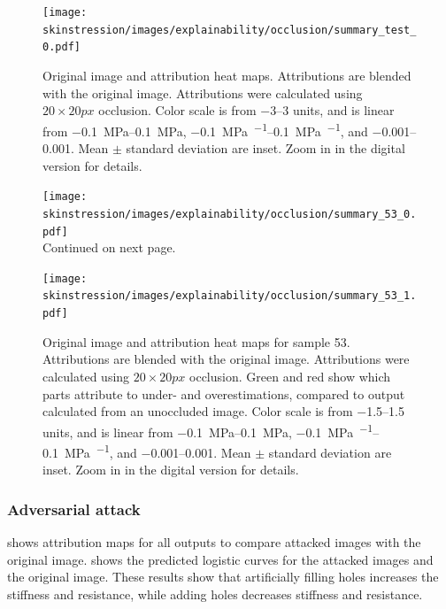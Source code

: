 \begin{figure}
    \centering
    \texttt{[image: skinstression/images/explainability/occlusion/summary\_test\_0.pdf]}
    \caption[Original image and attribution heat maps]{
        Original image and attribution heat maps.
        Attributions are blended with the original image.
        Attributions were calculated using $20\times 20\unit{px}$ occlusion.
        Color scale is from \numrange{-3}{3} units, and is linear from \qtyrange{-0.1}{0.1}{\mega\pascal}, \qtyrange{-0.1}{0.1}{\mega\pascal\per\stretch}, and \qtyrange{-0.001}{0.001}{\stretch}.
        Mean $\pm$ standard deviation are inset.
        Zoom in in the digital version for details.
    }
    \label{fig:skin_occlusion}
\end{figure}


\begin{figure}
    \ContinuedFloat
    \centering
    \texttt{[image: skinstression/images/explainability/occlusion/summary\_53\_0.pdf]} \\
    \raggedleft Continued on next page.
\end{figure}
\begin{figure}
    \centering
    \texttt{[image: skinstression/images/explainability/occlusion/summary\_53\_1.pdf]}
    \caption[Original image and attribution heat maps for sample 53]{
        Original image and attribution heat maps for sample 53.
        Attributions are blended with the original image.
        Attributions were calculated using $20\times 20\unit{px}$ occlusion.
        Green and red show which parts attribute to under- and overestimations, compared to output calculated from an unoccluded image.
        Color scale is from \numrange{-1.5}{1.5} units, and is linear from \qtyrange{-0.1}{0.1}{\mega\pascal}, \qtyrange{-0.1}{0.1}{\mega\pascal\per\stretch}, and \qtyrange{-0.001}{0.001}{\stretch}.
        Mean $\pm$ standard deviation are inset.
        Zoom in in the digital version for details.
    }
    \label{fig:skin_occlusion_53}
\end{figure}

\subsubsection{Adversarial attack}
 shows attribution maps for all outputs to compare attacked images with the original image.
 shows the predicted logistic curves for the attacked images and the original image.
These results show that artificially filling holes increases the stiffness and resistance, while adding holes decreases stiffness and resistance.

